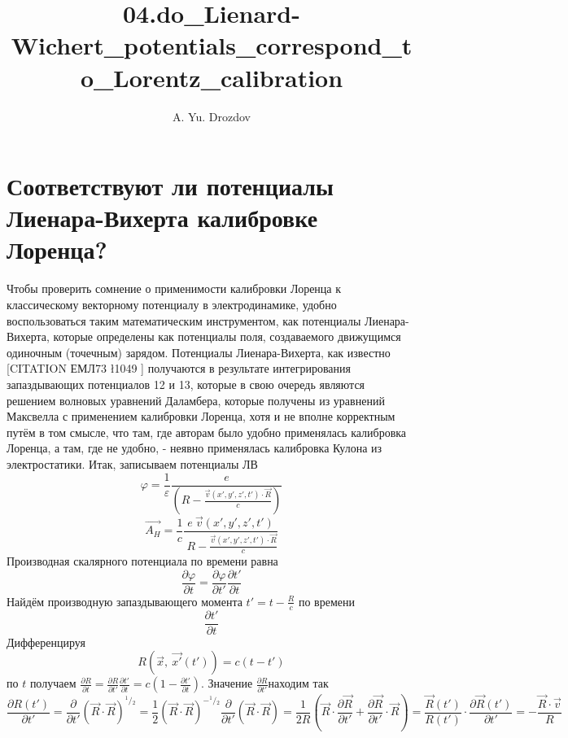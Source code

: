 \documentclass[11pt]{article}
\author{A. Yu. Drozdov}
\title{04.do\_Lienard-Wichert\_potentials\_correspond\_to\_Lorentz\_calibration}
\begin{document}
    
    \maketitle
    
    

    
    \section{Соответствуют ли потенциалы Лиенара-Вихерта калибровке
Лоренца?}\label{ux441ux43eux43eux442ux432ux435ux442ux441ux442ux432ux443ux44eux442-ux43bux438-ux43fux43eux442ux435ux43dux446ux438ux430ux43bux44b-ux43bux438ux435ux43dux430ux440ux430-ux432ux438ux445ux435ux440ux442ux430-ux43aux430ux43bux438ux431ux440ux43eux432ux43aux435-ux43bux43eux440ux435ux43dux446ux430}

Чтобы проверить сомнение о применимости калибровки Лоренца к
классическому векторному потенциалу в электродинамике, удобно
воспользоваться таким математическим инструментом, как потенциалы
Лиенара-Вихерта, которые определены как потенциалы поля, создаваемого
движущимся одиночным (точечным) зарядом. Потенциалы Лиенара-Вихерта, как
известно {[}CITATION ЕМЛ73 \l 1049 {]} получаются в результате
интегрирования запаздывающих потенциалов 12 и 13, которые в свою очередь
являются решением волновых уравнений Даламбера, которые получены из
уравнений Максвелла с применением калибровки Лоренца, хотя и не вполне
корректным путём в том смысле, что там, где авторам было удобно
применялась калибровка Лоренца, а там, где не удобно, - неявно
применялась калибровка Кулона из электростатики. Итак, записываем
потенциалы ЛВ
\[\varphi =\frac{1}{\varepsilon }\frac{e}{\left( R-\frac{\overrightarrow{v}\left( x',y',z',t' \right)\cdot \overrightarrow{R}}{c} \right)}\]
\[\overrightarrow{{{A}_{H}}}=\frac{1}{c}\frac{e\ \overrightarrow{v}\left( x',y',z',t' \right)}{\ R-\frac{\overrightarrow{v}\left( x',y',z',t' \right)\cdot \overrightarrow{R}}{c}}\]
Производная скалярного потенциала по времени равна
\[\frac{\partial \varphi }{\partial t}=\frac{\partial \varphi }{\partial t'}\frac{\partial t'}{\partial t}\]
Найдём производную запаздывающего момента \(t'=t-\frac{R}{c}\) по
времени \[\frac{\partial t'}{\partial t}\] Дифференцируя
\[R\left( \overrightarrow{x},\ \overrightarrow{x'}\left( t' \right) \right)=c\left( t-t' \right)\]
по \(t\) получаем
\(\frac{\partial R}{\partial t}=\frac{\partial R}{\partial t'}\frac{\partial t'}{\partial t}=c\left( 1-\frac{\partial t'}{\partial t} \right)\).
Значение \(\frac{\partial R}{\partial t'}\)находим так
\[\frac{\partial R\left( t' \right)}{\partial t'}=\frac{\partial }{\partial t'}{{\left( \overrightarrow{R}\cdot \overrightarrow{R} \right)}^{{}^{1}/{}_{2}}}=\frac{1}{2}{{\left( \overrightarrow{R}\cdot \overrightarrow{R} \right)}^{-{}^{1}/{}_{2}}}\frac{\partial }{\partial t'}\left( \overrightarrow{R}\cdot \overrightarrow{R} \right)=\frac{1}{2R}\left( \overrightarrow{R}\cdot \frac{\partial \overrightarrow{R}}{\partial t'}+\frac{\partial \overrightarrow{R}}{\partial t'}\cdot \overrightarrow{R} \right)=\frac{\overrightarrow{R}\left( t' \right)}{R\left( t' \right)}\cdot \frac{\partial \overrightarrow{R}\left( t' \right)}{\partial t'}=-\frac{\overrightarrow{R}\cdot \overrightarrow{v}}{R}\]
\end{document}

